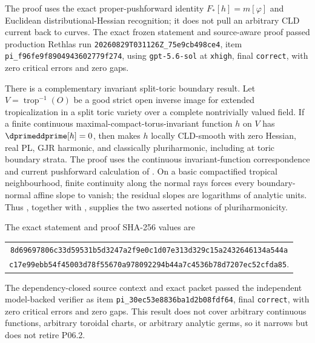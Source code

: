 The proof uses the exact proper-pushforward identity
\(F_*[h]=m[\varphi]\) and Euclidean distributional-Hessian recognition; it does
not pull an arbitrary CLD current back to curves.  The exact frozen statement
and source-aware proof passed production Rethlas run
\nolinkurl{20260829T031126Z_75e9cb498ce4}, item
\nolinkurl{pi_f96fe9f8904943602779f274}, using
\texttt{gpt-5.6-sol} at \texttt{xhigh}, final \texttt{correct}, with zero
critical errors and zero gaps.

There is a complementary invariant split-toric boundary result.  Let
\(V=\operatorname{trop}^{-1}(O)\) be a good strict open inverse image for
extended tropicalization in a split toric variety over a complete
nontrivially valued field.  If a finite continuous
maximal-compact-torus-invariant function \(h\) on \(V\) has
\(\dprimeddprime[h]=0\), then
makes \(h\) locally CLD-smooth with zero Hessian, real PL, GJR harmonic, and
classically pluriharmonic, including at toric boundary strata.  The proof
uses the continuous invariant-function correspondence and current
pushforward calculation of \cite[(5.5) and Proposition~5.3.10(iv)]{BGJKK25}.
On a basic compactified tropical neighbourhood, finite continuity along the
normal rays forces every boundary-normal affine slope to vanish; the residual
slopes are logarithms of analytic units.  Thus
\cite[Proposition~4.2 and Theorem~4.3]{GR25Classical}, together with
\cite[Definition~7.2]{GJR26}, supplies the two asserted notions of
pluriharmonicity.

The exact statement and proof SHA-256 values are
\begin{center}
\small
\begin{tabular}{@{}c@{}}
\nolinkurl{8d69697806c33d59531b5d3247a2f9e0c1d07e313d329c15a2432646134a544a}\\
\nolinkurl{c17e99ebb54f45003d78f55670a978092294b44a7c4536b78d7207ec52cfda85}.
\end{tabular}
\end{center}
The dependency-closed source context and exact packet passed the independent
model-backed verifier as item
\nolinkurl{pi_30ec53e8836ba1d2b08fdf64}, final \texttt{correct}, with zero
critical errors and zero gaps.  This result does not cover arbitrary
continuous functions, arbitrary toroidal charts, or arbitrary analytic
germs, so it narrows but does not retire P06.2.

